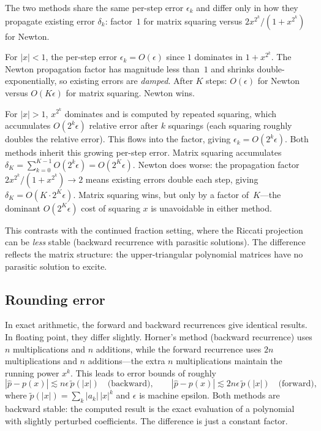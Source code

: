 \documentclass{article}
\begin{document}
The two methods share the same per-step error $\epsilon_k$ and differ only in how they propagate existing error $\delta_k$: factor~$1$ for matrix squaring versus $2x^{2^k}/(1 + x^{2^k})$ for Newton.

For $|x| < 1$, the per-step error $\epsilon_k = O(\epsilon)$ since $1$ dominates in $1 + x^{2^k}$. The Newton propagation factor has magnitude less than~$1$ and shrinks double-exponentially, so existing errors are \emph{damped}. After $K$ steps: $O(\epsilon)$ for Newton versus $O(K\epsilon)$ for matrix squaring. Newton wins.

For $|x| > 1$, $x^{2^k}$ dominates and is computed by repeated squaring, which accumulates $O(2^k \epsilon)$ relative error after $k$ squarings (each squaring roughly doubles the relative error). This flows into the factor, giving $\epsilon_k = O(2^k \epsilon)$. Both methods inherit this growing per-step error. Matrix squaring accumulates $\delta_K = \sum_{k=0}^{K-1} O(2^k \epsilon) = O(2^K \epsilon)$. Newton does worse: the propagation factor $2x^{2^k}/(1+x^{2^k}) \to 2$ means existing errors double each step, giving $\delta_K = O(K \cdot 2^K \epsilon)$. Matrix squaring wins, but only by a factor of~$K$---the dominant $O(2^K \epsilon)$ cost of squaring $x$ is unavoidable in either method.

This contrasts with the continued fraction setting, where the Riccati projection can be \emph{less} stable (backward recurrence with parasitic solutions). The difference reflects the matrix structure: the upper-triangular polynomial matrices have no parasitic solution to excite.

\subsection*{Rounding error}

In exact arithmetic, the forward and backward recurrences give identical results. In floating point, they differ slightly. Horner's method (backward recurrence) uses $n$ multiplications and $n$ additions, while the forward recurrence uses $2n$ multiplications and $n$ additions---the extra $n$ multiplications maintain the running power $x^k$. This leads to error bounds of roughly
\begin{equation}
  |\hat p - p(x)| \lesssim n\epsilon\,\tilde p(|x|) \quad\text{(backward)}, \qquad
  |\hat p - p(x)| \lesssim 2n\epsilon\,\tilde p(|x|) \quad\text{(forward)},
\end{equation}
where $\tilde p(|x|) = \sum_k |a_k|\,|x|^k$ and $\epsilon$ is machine epsilon. Both methods are backward stable: the computed result is the exact evaluation of a polynomial with slightly perturbed coefficients. The difference is just a constant factor.
\end{document}
